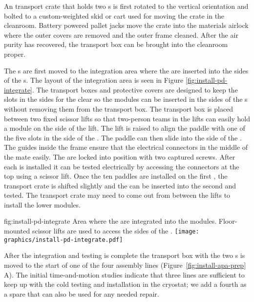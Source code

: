   
An  transport crate that holds two s  is first rotated to the vertical orientation and bolted to a custom-weighted skid or cart used for moving the crate in the cleanroom. 
Battery powered pallet jacks move the crate into the materials airlock where the outer covers are removed and the outer frame cleaned. 
After the air purity has recovered, the transport box can be brought into the cleanroom proper. 

The s are first moved to the  integration area where the  are inserted into the sides of the s.
The layout of the  integration area is seen in Figure \ref{fig:install-pd-integrate}.
The  transport boxes and  protective covers are designed to keep the slots in the sides for the  clear so the  modules can be inserted in the sides of the s without removing them from the transport box. 
The  transport box is placed between two fixed scissor lifts so that two-person teams in the lifts can easily hold a  module on the side of the lift. 
The lift is raised to align the paddle with one of the five slots in the side of the . The paddle can then slide into the side of the . 
The guides inside the  frame ensure that the electrical connectors in the middle of the  mate easily. 
The  are locked into position with two captured screws. 
After each  is installed it can be tested electrically by accessing the connectors at the top using a scissor lift. 
Once the ten  paddles are installed on the first , the transport crate is shifted slightly and the  can be inserted into the second  and tested. 
The  transport crate may need to come out from between the lifts to install the lower  modules.

\begin{dunefigure}
{fig:install-pd-integrate}
{Area where the  are integrated into the  modules. Floor-mounted scissor lifts are used to access the sides of the .}
\texttt{[image: graphics/install-pd-integrate.pdf]}
\end{dunefigure}

After the  integration and testing is complete the transport box with the two s is moved to the start of one of the four assembly lines (Figure~\ref{fig:install-apa-prep} A). 
The initial time-and-motion studies indicate that three lines are sufficient to keep up with the cold testing and installation in the cryostat; we add a fourth as a spare that can also be used for any needed repair. 


